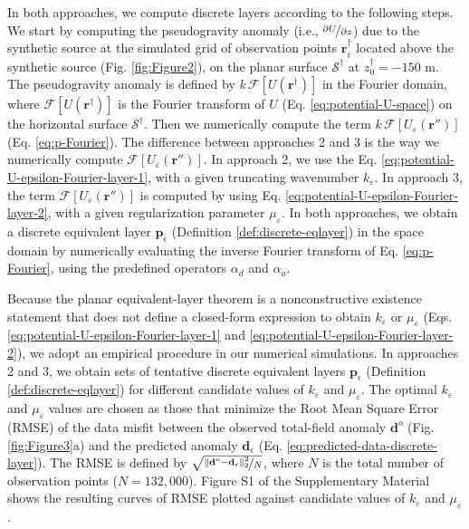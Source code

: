 In both approaches, we compute discrete layers according to the following steps.
We start by computing the pseudogravity anomaly 
(i.e., $\nicefrac{\partial U}{\partial z}$) due to the synthetic source 
at the simulated grid of observation points $\mathbf{r}^{\dagger}_{i}$ located above the synthetic source (Fig. \ref{fig:Figure2}), 
on the planar surface $\mathcal{S}^{\dagger}$ at $z^{\dagger}_{0} = -150$ m.
The pseudogravity anomaly is defined by $k \, \mathcal{F}\left[ U(\mathbf{r}^{\dagger}) \right]$ in the Fourier domain,
where $\mathcal{F}\left[ U(\mathbf{r}^{\dagger}) \right]$ is the Fourier transform of
$U$ (Eq. \ref{eq:potential-U-space}) on the horizontal surface $\mathcal{S}^{\dagger}$.
Then we numerically compute the term $k \, \mathcal{F}\left[ U_{\varepsilon}(\mathbf{r}'') \right]$ (Eq. \ref{eq:p-Fourier}).
The difference between approaches 2 and 3 is the way we numerically compute $\mathcal{F}\left[ U_{\varepsilon}(\mathbf{r}'') \right]$.
In approach 2, we use the Eq. 
\ref{eq:potential-U-epsilon-Fourier-layer-1}, with a given truncating wavenumber $k_{\varepsilon}$. 
In approach 3, the term $\mathcal{F}\left[ U_{\varepsilon}(\mathbf{r}'') \right]$ is computed by using Eq. 
\ref{eq:potential-U-epsilon-Fourier-layer-2}, with a given regularization parameter $\mu_{\varepsilon}$.
In both approaches, we obtain a discrete equivalent layer $\mathbf{p}_{\epsilon}$ (Definition \ref{def:discrete-eqlayer})
in the space domain by numerically evaluating the inverse Fourier transform of Eq. \ref{eq:p-Fourier}, 
using the predefined operators $\alpha_{d}$ and $\alpha_{a}$.

Because the planar equivalent-layer theorem \citep{oliveirajr_etal2026_1} is a nonconstructive existence 
statement that does not define a closed-form expression to obtain $k_{\varepsilon}$ or $\mu_{\varepsilon}$ 
(Eqs. \ref{eq:potential-U-epsilon-Fourier-layer-1} and \ref{eq:potential-U-epsilon-Fourier-layer-2}), 
we adopt an empirical procedure in our numerical simulations. In approaches 2 and 3, we obtain sets 
of tentative discrete equivalent layers $\mathbf{p}_{\epsilon}$ (Definition \ref{def:discrete-eqlayer}) 
for different candidate values of $k_{\varepsilon}$ and $\mu_{\varepsilon}$. The optimal $k_{\varepsilon}$ 
and $\mu_{\varepsilon}$ values are chosen as those that minimize the Root Mean Square Error (RMSE) of 
the data misfit between the observed total-field anomaly $\mathbf{d}^{o}$ (Fig. \ref{fig:Figure3}a) 
and the predicted anomaly $\mathbf{d}_{\epsilon}$ (Eq. \ref{eq:predicted-data-discrete-layer}). 
The RMSE is defined by $\sqrt{\nicefrac{\| \mathbf{d}^{o} - \mathbf{d}_{\epsilon}\|^{2}_{2}}{N}}$, 
where $N$ is the total number of observation points ($N = 132,000$). Figure S1 of the Supplementary 
Material shows the resulting curves of RMSE plotted against candidate values of 
$k_{\varepsilon}$ and $\mu_{\varepsilon}$.


